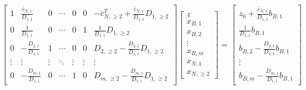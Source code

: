 \documentclass[border=3pt,math]{standalone}
\begin{document}
{
\renewcommand{\arraystretch}{2.0}
\setlength{\arraycolsep}{7pt}

    \[
        \left[ \begin{array}{c|cccc|cc}
            1       & \frac{\bar{c}_{N, 1}}{D_{1, 1}}     & 0         & \cdots    & 0         & 0         & -\bar{c}_{N, \geq 2}^T + \frac{\bar{c}_{N, 1}}{D_{1, 1}} D_{1, \geq 2}    \\
            \hline
            0       & \frac{1}{D_{1, 1}}            & 0         & \cdots    & 0         & 1         & \frac{1}{D_{1, 1}} D_{1, \geq 2}                              \\
            0       & - \frac{D_{2, 1}}{D_{1, 1}}   & 1         & \cdots    & 0         & 0         & D_{2, \geq 2} - \frac{D_{2, 1}}{D_{1, 1}} D_{1, \geq 2}       \\
            \vdots  & \vdots                        & \vdots    & \ddots    & \vdots    & \vdots    & \vdots                                                        \\
            0       & - \frac{D_{m, 1}}{D_{1, 1}}   & 0         & \cdots    & 1         & 0         & D_{m, \geq 2} - \frac{D_{m, 1}}{D_{1, 1}} D_{1, \geq 2}
        \end{array} \right]
        \left[ \begin{array}{c}
            z           \\
            \hline
            x_{B, 1}    \\
            x_{B, 2}    \\
            \vdots      \\
            x_{B, m}    \\
            \hline
            x_{N, 1}    \\
            x_{N, \geq 2}
        \end{array} \right]
        =
        \left[ \begin{array}{c}
            z_0 + \frac{\bar{c}_{N, 1}}{D_{1, 1}} b_{B, 1}        \\
            \hline
            \frac{1}{D_{1, 1}} b_{B, 1}                     \\
            b_{B, 2} - \frac{D_{2, 1}}{D_{1, 1}} b_{B, 1}   \\
            \vdots                                          \\
            b_{B, m} - \frac{D_{m, 1}}{D_{1, 1}} b_{B, 1}
        \end{array} \right]
    \]
}
\end{document}

